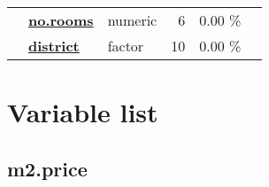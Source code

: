 \documentclass[]{article}
\begin{document}
\begin{longtable}[]{@{}lllrcl@{}}
\begin{minipage}[t]{0.09\columnwidth}\raggedright\strut
\strut
\end{minipage} & \begin{minipage}[t]{0.28\columnwidth}\raggedright\strut
\textbf{\protect\hyperlink{no.rooms}{no.rooms}}\strut
\end{minipage} & \begin{minipage}[t]{0.11\columnwidth}\raggedright\strut
numeric\strut
\end{minipage} & \begin{minipage}[t]{0.12\columnwidth}\raggedleft\strut
6\strut
\end{minipage} & \begin{minipage}[t]{0.11\columnwidth}\centering\strut
0.00 \%\strut
\end{minipage} & \begin{minipage}[t]{0.14\columnwidth}\raggedright\strut
\strut
\end{minipage}\tabularnewline
\begin{minipage}[t]{0.09\columnwidth}\raggedright\strut
\strut
\end{minipage} & \begin{minipage}[t]{0.28\columnwidth}\raggedright\strut
\textbf{\protect\hyperlink{district}{district}}\strut
\end{minipage} & \begin{minipage}[t]{0.11\columnwidth}\raggedright\strut
factor\strut
\end{minipage} & \begin{minipage}[t]{0.12\columnwidth}\raggedleft\strut
10\strut
\end{minipage} & \begin{minipage}[t]{0.11\columnwidth}\centering\strut
0.00 \%\strut
\end{minipage} & \begin{minipage}[t]{0.14\columnwidth}\raggedright\strut
\strut
\end{minipage}\tabularnewline
\bottomrule
\end{longtable}

\section{Variable list}\label{variable-list}

\hypertarget{m2.price}{\subsection{m2.price}\label{m2.price}}
\end{document}
